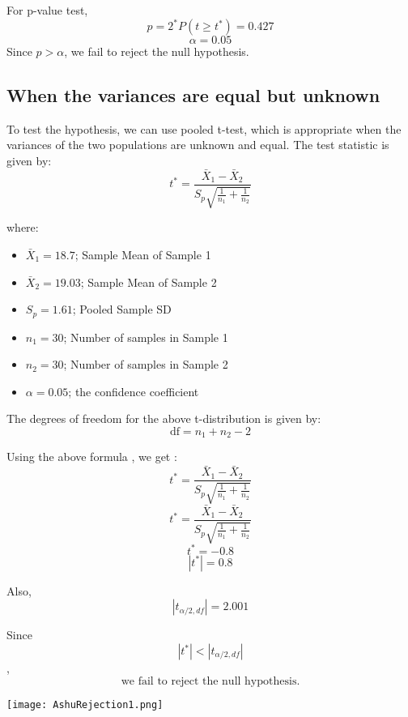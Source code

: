 \documentclass[oneside]{book}
\begin{document}
For p-value test,
\[p = 2^*P(t \geq t^*) = 0.427\]
\[\alpha = 0.05\]
Since $p > \alpha$, we fail to reject the null hypothesis.


\subsection{When the variances are equal but unknown}
To test the hypothesis, we can use pooled t-test, which is appropriate when the variances of the two populations are unknown and equal. The test statistic is given by:
\[ t^* = \frac{\bar{X}_1 - \bar{X}_2}{S_p \sqrt{\frac{1}{n_1} + \frac{1}{n_2}}} \]

where:
\begin{itemize}
    \item $\bar{X}_1 = 18.7$; Sample Mean of Sample 1
    \item $\bar{X}_2 = 19.03$; Sample Mean of Sample 2
    \item $S_p = 1.61$; Pooled Sample SD
    \item $n_1 = 30$; Number of samples in Sample 1 
    \item $n_2 = 30$; Number of samples in Sample 2
    \item $\alpha = 0.05$; the confidence coefficient
\end{itemize}
The degrees of freedom for the above t-distribution is given by:
\Large \[ \text{df} = n_1 + n_2 - 2\]

\large Using the above formula , we get :
\[ t^* = \frac{\bar{X}_1 - \bar{X}_2}{S_p \sqrt{\frac{1}{n_1} + \frac{1}{n_2}}}\]
\[ t^* = \frac{\bar{X}_1 - \bar{X}_2}{S_p \sqrt{\frac{1}{n_1} + \frac{1}{n_2}}}\]
\[ t^* = -0.8\]
\[ |t^*| = 0.8\]

Also,
\[|t_{\alpha/2, df}| = 2.001\] 

Since 
\[ |t^*| < |t_{\alpha/2, df}|\],
\[\text{we fail to reject the null hypothesis.}\]


\begin{minipage}{\textwidth}
    \centering
    \texttt{[image: AshuRejection1.png]}
    \label{fig:enter-label}
\end{minipage}
\end{document}
